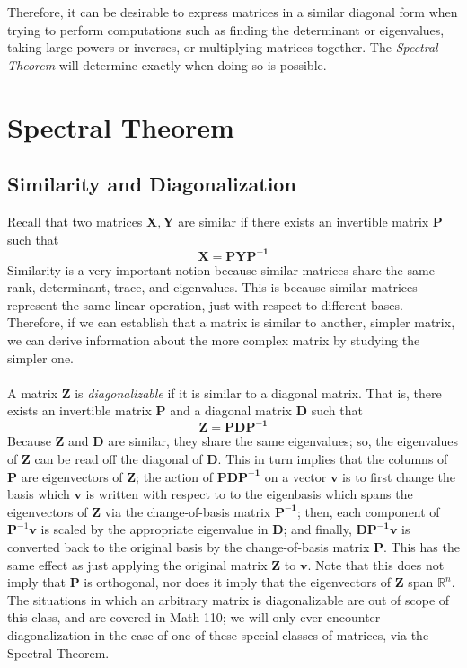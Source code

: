 \documentclass{article}
\begin{document}
Therefore, it can be desirable to express matrices in a similar diagonal form when trying to perform computations such as finding the determinant or eigenvalues, taking large powers or inverses, or multiplying matrices together. The \textit{Spectral Theorem} will determine exactly when doing so is possible.

\section{Spectral Theorem}

\subsection{Similarity and Diagonalization}
Recall that two matrices $\mathbf{X, Y}$ are similar if there exists an invertible matrix $\mathbf{P}$ such that $$\mathbf{X} = \mathbf{PYP^{-1}}$$ Similarity is a very important notion because similar matrices share the same rank, determinant, trace, and eigenvalues. This is because similar matrices represent the same linear operation, just with respect to different bases. Therefore, if we can establish that a matrix is similar to another, simpler matrix, we can derive information about the more complex matrix by studying the simpler one. \\\\
A matrix $\mathbf{Z}$ is \textit{diagonalizable} if it is similar to a diagonal matrix. That is, there exists an invertible matrix $\mathbf{P}$ and a diagonal matrix $\mathbf{D}$ such that $$\mathbf{Z} = \mathbf{PDP^{-1}}$$ Because $\mathbf{Z}$ and $\mathbf{D}$ are similar, they share the same eigenvalues; so, the eigenvalues of $\mathbf{Z}$ can be read off the diagonal of $\mathbf{D}$. This in turn implies that the columns of $\mathbf{P}$ are eigenvectors of $\mathbf{Z}$; the action of $\mathbf{PDP^{-1}}$ on a vector $\mathbf{v}$ is to first change the basis which $\mathbf{v}$ is written with respect to to the eigenbasis which spans the eigenvectors of $\mathbf{Z}$ via the change-of-basis matrix $\mathbf{P^{-1}}$; then, each component of $\mathbf{P}^{-1}\mathbf{v}$ is scaled by the appropriate eigenvalue in $\mathbf{D}$; and finally, $\mathbf{DP^{-1}v}$ is converted back to the original basis by the change-of-basis matrix $\mathbf{P}$. This has the same effect as just applying the original matrix $\mathbf{Z}$ to $\mathbf{v}$. Note that this does not imply that $\mathbf{P}$ is orthogonal, nor does it imply that the eigenvectors of $\mathbf{Z}$ span $\mathbb{R}^n$. The situations in which an arbitrary matrix is diagonalizable are out of scope of this class, and are covered in Math 110; we will only ever encounter diagonalization in the case of one of these special classes of matrices, via the Spectral Theorem.
\end{document}
